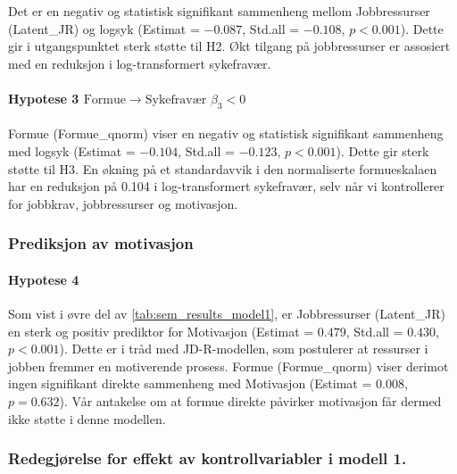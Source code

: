 \documentclass[
  12pt,
  a4paper,
  DIV=11,
  numbers=noendperiod]{scrartcl}
\let\oldparagraph\paragraph
\renewcommand{\paragraph}[1]{\oldparagraph{#1}\mbox{}}
\begin{document}
Det er en negativ og statistisk signifikant sammenheng mellom
Jobbressurser (Latent\_JR) og logsyk (Estimat = \(-0.087\), Std.all =
\(-0.108\), \(p < 0.001\)). Dette gir i utgangspunktet sterk støtte til
H2. Økt tilgang på jobbressurser er assosiert med en reduksjon i
log-transformert sykefravær.

\paragraph{\texorpdfstring{Hypotese 3
\(\text{Formue} \rightarrow \text{Sykefravær } \beta_3 < 0\)}{Hypotese 3 \textbackslash text\{Formue\} \textbackslash rightarrow \textbackslash text\{Sykefravær \} \textbackslash beta\_3 \textless{} 0}}\label{hypotese-3-textformue-rightarrow-textsykefravuxe6r-beta_3-0}

Formue (Formue\_qnorm) viser en negativ og statistisk signifikant
sammenheng med logsyk (Estimat = \(-0.104\), Std.all = \(-0.123\),
\(p < 0.001\)). Dette gir sterk støtte til H3. En økning på et
standardavvik i den normaliserte formueskalaen har en reduksjon på 0.104
i log-transformert sykefravær, selv når vi kontrollerer for jobbkrav,
jobbressurser og motivasjon.

\subsubsection{Prediksjon av motivasjon}\label{prediksjon-av-motivasjon}

\paragraph{Hypotese 4}\label{hypotese-4}

Som vist i øvre del av \autoref{tab:sem_results_model1}, er
Jobbressurser (Latent\_JR) en sterk og positiv prediktor for Motivasjon
(Estimat = \(0.479\), Std.all = \(0.430\), \(p < 0.001\)). Dette er i
tråd med JD-R-modellen, som postulerer at ressurser i jobben fremmer en
motiverende prosess. Formue (Formue\_qnorm) viser derimot ingen
signifikant direkte sammenheng med Motivasjon (Estimat = \(0.008\),
\(p = 0.632\)). Vår antakelse om at formue direkte påvirker motivasjon
får dermed ikke støtte i denne modellen.

\subsubsection{Redegjørelse for effekt av kontrollvariabler i modell
1.}\label{redegjuxf8relse-for-effekt-av-kontrollvariabler-i-modell-1.}
\end{document}
